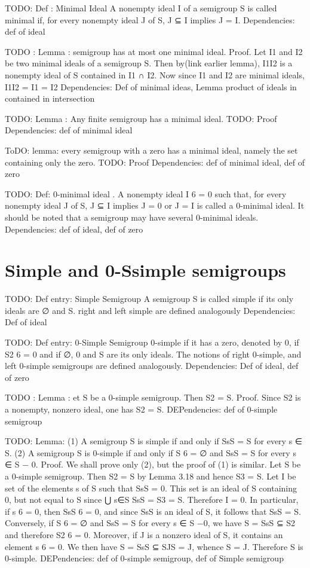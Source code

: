 TODO: Def : Minimal Ideal
A nonempty ideal I of a semigroup S is called minimal if, for every nonempty
ideal J of S, J ⊆ I implies J = I.
Dependencies: def of ideal

TODO : Lemma :  semigroup has at most one minimal ideal.
Proof. Let I1 and I2 be two minimal ideals of a semigroup S. Then by(link earlier lemma), I1I2 is a nonempty ideal of S contained in I1 ∩ I2. Now since I1 and
I2 are minimal ideals, I1I2 = I1 = I2
Dependencies: Def of minimal ideas, Lemma product of ideals in contained in intersection

TODO: Lemma : Any finite semigroup has a minimal ideal.
TODO: Proof
Dependencies: def of minimal ideal

ToDO: lemma: every semigroup with a zero has a minimal ideal, namely the set containing only the zero.
TODO: Proof
Dependencies: def of minimal ideal, def of zero

TODO: Def: 0-minimal ideal
. A
nonempty ideal I 6 = 0 such that, for every nonempty ideal J of S, J ⊆ I implies
J = 0 or J = I is called a 0-minimal ideal. It should be noted that a semigroup
may have several 0-minimal ideals.
Dependencies: def of ideal, def of zero

\section {Simple and 0-Ssimple semigroups}

TODO: Def entry: Simple Semigroup
A semigroup S is called simple if its only ideals are ∅ and S.
right and left simple are defined analogously
Dependencies: Def of ideal

TODO: Def entry: 0-Simple Semigroup
 0-simple if it has a zero, denoted by 0, if S2 6 = {0} and if ∅, 0 and S are its only
ideals. The notions of right 0-simple, and left 0-simple
semigroups are defined analogously.
Dependencies: Def of ideal, def of zero

TODO : Lemma : et S be a 0-simple semigroup. Then S2 = S.
Proof. Since S2 is a nonempty, nonzero ideal, one has S2 = S.
DEPendencies: def of 0-simple semigroup

TODO: Lemma: 
(1) A semigroup S is simple if and only if SsS = S for every s ∈ S.
(2) A semigroup S is 0-simple if and only if S 6 = ∅ and SsS = S for every
s ∈ S − 0.
Proof. We shall prove only (2), but the proof of (1) is similar.
Let S be a 0-simple semigroup. Then S2 = S by Lemma 3.18 and hence
S3 = S.
Let I be set of the elements s of S such that SsS = 0. This set is an ideal of
S containing 0, but not equal to S since ⋃
s∈S SsS = S3 = S. Therefore I = 0.
In particular, if s 6 = 0, then SsS 6 = 0, and since SsS is an ideal of S, it follows
that SsS = S.
Conversely, if S 6 = ∅ and SsS = S for every s ∈ S −0, we have S = SsS ⊆ S2
and therefore S2 6 = 0. Moreover, if J is a nonzero ideal of S, it contains an
element s 6 = 0. We then have S = SsS ⊆ SJS = J, whence S = J. Therefore
S is 0-simple.
DEPendencies: def of 0-simple semigroup, def of Simple semigroup

